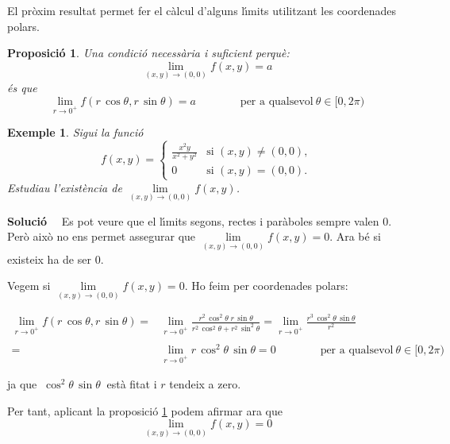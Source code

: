 \documentclass[12pt]{article}
\newcommand{\solucio}{\textbf{Soluci{\'o}}\ \ }
\newtheorem{proposicio}{Proposici{\'o}}[subsection]
\newtheorem{exemple}{Exemple}[subsection]
\begin{document}
El pr{\`o}xim resultat permet fer el c{\`a}lcul d'alguns l{\'\i}mits utilitzant les coordenades polars.


\begin{proposicio}\label{lim coord polars}
Una condici{\'o} necess{\`a}ria i suficient perqu{\`e}:
$$
\lim\limits_{(x,y)\to (0,0)}f(x,y)= a
$$
{\'e}s que
$$
\lim\limits_{r\to 0^+}f(r\,\cos\theta,r\,\sin\theta)= a\qquad\qquad\textrm{per a qualsevol} \ \theta \in [0,2\pi)
$$
\end{proposicio}

\vspace{0.4cm}
\begin{exemple}
Sigui la funci{\'o}
\[
f(x,y)=\begin{cases} \frac{x^2 y}{x^2+y^2} & \text{si $(x,y)\not=
(0,0)$},\\ 0 & \text{si $(x,y)=(0,0)$.}
\end{cases}
\]
Estudiau l'exist{\`e}ncia de $\lim\limits_{(x,y)\to (0,0)} f(x,y)$.
\end{exemple}

\solucio
Es pot veure que el l{\'\i}mits segons, rectes i par{\`a}boles sempre valen $0$. Per{\`o} aix{\`o} no ens permet assegurar que
$\lim\limits_{(x,y)\to (0,0)} f(x,y)=0$. Ara b{\'e} si existeix ha
de ser $0$.

Vegem si $\lim\limits_{(x,y)\to (0,0)} f(x,y)=0$. Ho feim per coordenades polars:

\begin{align*}
\lim\limits_{r\to 0^+}f(r\,\cos\theta,r\,\sin\theta)=&\lim\limits_{r\to 0^+}\frac{r^2\,\cos^2 \theta\;r\,\sin\theta}{r^2\,\cos^2 \theta+r^2\,\sin^2\theta}=\lim\limits_{r\to 0^+}\frac{r^3\,\cos^2 \theta\,\sin\theta}{r^2}\\
&\\
=& \lim\limits_{r\to 0^+}r\,\cos^2 \theta\,\sin\theta=0\qquad \qquad\textrm{per a qualsevol} \ \theta \in [0,2\pi)
\end{align*}

ja que $\ \cos^2 \theta\,\sin\theta\ $ est{\`a} fitat i $r$ tendeix a zero.


Per tant, aplicant la proposici{\'o} \ref{lim coord polars} podem afirmar ara que
$$
\lim\limits_{(x,y)\to (0,0)}
f(x,y)=0
$$
\end{document}
